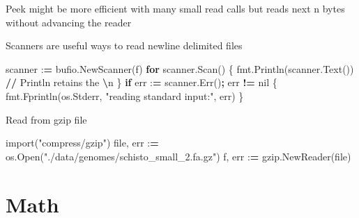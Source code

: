 \documentclass[]{book}
\newenvironment{Shaded}{\begin{snugshade}}{\end{snugshade}}
\newcommand{\BuiltInTok}[1]{#1}
\newcommand{\CharTok}[1]{\textcolor[rgb]{0.31,0.60,0.02}{#1}}
\newcommand{\ControlFlowTok}[1]{\textcolor[rgb]{0.13,0.29,0.53}{\textbf{#1}}}
\newcommand{\DecValTok}[1]{\textcolor[rgb]{0.00,0.00,0.81}{#1}}
\newcommand{\ImportTok}[1]{#1}
\newcommand{\NormalTok}[1]{#1}
\newcommand{\OperatorTok}[1]{\textcolor[rgb]{0.81,0.36,0.00}{\textbf{#1}}}
\newcommand{\SpecialCharTok}[1]{\textcolor[rgb]{0.00,0.00,0.00}{#1}}
\newcommand{\StringTok}[1]{\textcolor[rgb]{0.31,0.60,0.02}{#1}}
\begin{document}
Peek might be more efficient with many small read calls but reads next n bytes without advancing the reader

\begin{Shaded}
\end{Shaded}

Scanners are useful ways to read newline delimited files

\begin{Shaded}
\begin{Highlighting}[]
\NormalTok{scanner :}\OperatorTok{=}\NormalTok{ bufio.NewScanner(f)                             }
\ControlFlowTok{for}\NormalTok{ scanner.Scan() \{                                       }
\NormalTok{    fmt.Println(scanner.Text()) }\OperatorTok{//}\NormalTok{ Println retains the }\OperatorTok{\textbackslash{}}\NormalTok{n  }
\NormalTok{\}                                                          }
\ControlFlowTok{if}\NormalTok{ err :}\OperatorTok{=}\NormalTok{ scanner.Err()}\OperatorTok{;}\NormalTok{ err }\OperatorTok{!=}\NormalTok{ nil \{                      }
\NormalTok{    fmt.Fprintln(os.Stderr, }\StringTok{"reading standard input:"}\NormalTok{, err)}
\NormalTok{\}}
\end{Highlighting}
\end{Shaded}

Read from gzip file

\begin{Shaded}
\begin{Highlighting}[]
\ImportTok{import}\NormalTok{(}\StringTok{"compress/gzip"}\NormalTok{)                                                          }
\BuiltInTok{file}\NormalTok{, err :}\OperatorTok{=}\NormalTok{ os.Open(}\StringTok{"./data/genomes/schisto_small_2.fa.gz"}\NormalTok{)}
\NormalTok{f, err :}\OperatorTok{=}\NormalTok{ gzip.NewReader(}\BuiltInTok{file}\NormalTok{)}
\end{Highlighting}
\end{Shaded}

\hypertarget{math}{%
\section{Math}\label{math}}
\end{document}
